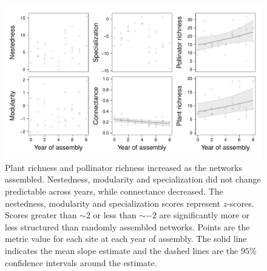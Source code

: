 \documentclass[12pt]{article}
\begin{document}
\begin{figure}
  \centering
  \includegraphics[width=1\textwidth]{../analysis/networkLevel/figures/baci.pdf}
  \caption{Plant richness and pollinator richness increased as the
    networks assembled. Nestedness, modularity and specialization did
    not change predictable across years, while connectance
    decreased. The nestedness, modularity and specialization scores
    represent $z$-scores. Scores greater than $\sim 2$ or less than
    $\sim -2$ are significantly more or less structured than randomly
    assembled networks. Points are the metric value for each site at
    each year of assembly. The solid line indicates the mean slope
    estimate and the dashed lines are the $95\%$ confidence intervals
    around the estimate.}
  \label{fig:baci}
\end{figure}
\clearpage
\end{document}
